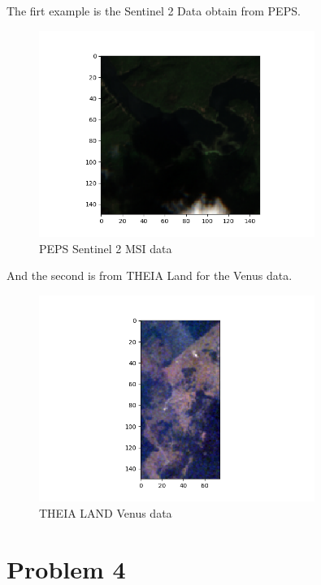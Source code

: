 \documentclass[a4paper,11pt]{article}
\theoremstyle{mytheor}
\begin{document}
The firt example is the Sentinel 2 Data obtain from PEPS.\\

\begin{figure}[h]
    \centering
    \includegraphics[width=0.8\textwidth]{PEPS_show.png}
    \caption{PEPS Sentinel 2 MSI data}
    \label{fig:mesh1}
\end{figure}

And the second is from THEIA Land for the Venus data.\\

\begin{figure}[h]
    \centering
    \includegraphics[width=0.8\textwidth]{VENUS_show.png}
    \caption{THEIA LAND Venus data}
    \label{fig:mesh1}
\end{figure}



\section*{Problem 4}
\end{document}
